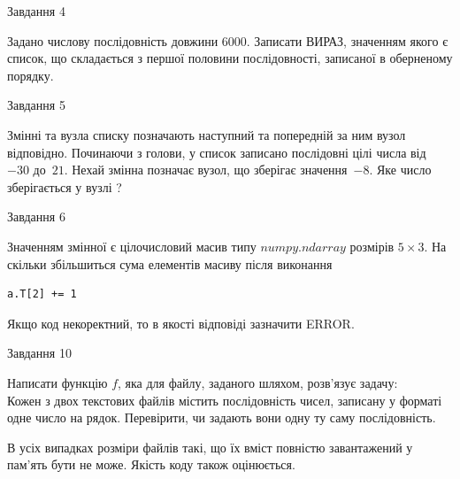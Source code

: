 \documentclass[12pt, ukrainian]{article}
\begin{document}
{               
{\begin{center}Завдання {4}\end{center}}
\vspace{-6mm}

 Задано числову послідовність  довжини 6000. Записати ВИРАЗ, значенням якого є список, що складається з першої половини послідовності, записаної в оберненому порядку.\par

\vspace{10mm}
               
{\begin{center}Завдання {5}\end{center}}
\vspace{-6mm}
Змінні  та  вузла списку позначають наступний та попередній за ним вузол відповідно. Починаючи з голови, у список записано послідовні цілі числа від~$-30$ до~$21$. Нехай змінна  позначає вузол, що зберігає значення~$-8$.
Яке число зберігається у вузлі  ?\par

               
{\begin{center}Завдання {6}\end{center}}
\vspace{-6mm}
Значенням змінної  є цілочисловий масив типу $numpy.ndarray$ розмірів $5{\times}3$. На скільки збільшиться сума елементів масиву  після виконання
\begin{verbatim}
a.T[2] += 1
\end{verbatim}


Якщо код некоректний, то в якості відповіді зазначити ERROR.\par

               
{\begin{center}Завдання {10}\end{center}}
\vspace{-6mm}

Написати функцію $f$, яка для файлу, заданого шляхом, розв’язує задачу:\\ Кожен з двох текстових файлів містить послідовність чисел, записану у форматі одне число на рядок.  Перевірити, чи задають вони одну ту саму послідовність.

В усіх випадках розміри файлів такі, що їх вміст повністю завантажений у пам'ять бути не може. Якість коду також оцінюється.



\vspace{10mm}\par

}
\end{document}
